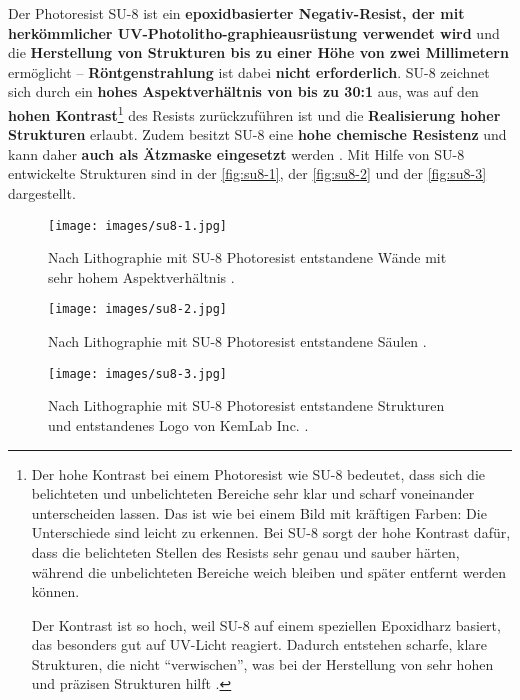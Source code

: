 \documentclass{article} %
\begin{document}
Der Photoresist SU-8 ist ein \textbf{epoxidbasierter Negativ-Resist, der mit herkömmlicher UV-Photolitho-graphieausrüstung verwendet wird} und die \textbf{Herstellung von Strukturen bis zu einer Höhe von zwei Millimetern} ermöglicht -- \textbf{Röntgenstrahlung} ist dabei \textbf{nicht erforderlich}. SU-8 zeichnet sich durch ein \textbf{hohes Aspektverhältnis von bis zu 30:1} aus, was auf den \textbf{hohen Kontrast}\footnote{Der hohe Kontrast bei einem Photoresist wie SU-8 bedeutet, dass sich die belichteten und unbelichteten Bereiche sehr klar und scharf voneinander unterscheiden lassen. Das ist wie bei einem Bild mit kräftigen Farben: Die Unterschiede sind leicht zu erkennen. Bei SU-8 sorgt der hohe Kontrast dafür, dass die belichteten Stellen des Resists sehr genau und sauber härten, während die unbelichteten Bereiche weich bleiben und später entfernt werden können. 

Der Kontrast ist so hoch, weil SU-8 auf einem speziellen Epoxidharz basiert, das besonders gut auf UV-Licht reagiert. Dadurch entstehen scharfe, klare Strukturen, die nicht ``verwischen'', was bei der Herstellung von sehr hohen und präzisen Strukturen hilft \cite{Lorenz1997, Jensen2002, DelCampo2007}.} des Resists zurückzuführen ist und die \textbf{Realisierung hoher Strukturen} erlaubt. Zudem besitzt SU-8 eine \textbf{hohe chemische Resistenz} und kann daher \textbf{auch als Ätzmaske eingesetzt} werden \cite{schmid2024}. Mit Hilfe von SU-8 entwickelte Strukturen sind in der \autoref{fig:su8-1}, der \autoref{fig:su8-2} und der \autoref{fig:su8-3} dargestellt. 

\begin{figure}[htb!]
    \centering
    \texttt{[image: images/su8-1.jpg]} %
    \captionsetup{labelfont=bf, width=.75\textwidth} %
    \caption{Nach Lithographie mit SU-8 Photoresist entstandene Wände mit sehr hohem Aspektverhältnis \cite{SU8Photoresist}.}
    \label{fig:su8-1}
\end{figure}

\begin{figure}[htb!]
    \centering
    \texttt{[image: images/su8-2.jpg]} %
    \captionsetup{labelfont=bf, width=.7\textwidth} %
    \caption{Nach Lithographie mit SU-8 Photoresist entstandene Säulen \cite{Tian2005}.}
    \label{fig:su8-2}
\end{figure}

\begin{figure}[htb!]
    \centering
    \texttt{[image: images/su8-3.jpg]} %
    \captionsetup{labelfont=bf, width=.85\textwidth} %
    \caption{Nach Lithographie mit SU-8 Photoresist entstandene Strukturen und entstandenes Logo von KemLab Inc. \cite{KemLab2023}.}
    \label{fig:su8-3}
\end{figure}
\end{document}
